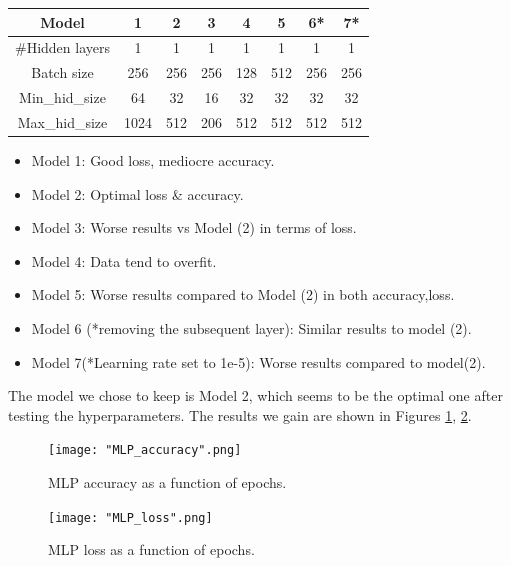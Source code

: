 \documentclass[10pt, a4paper]{article}
\begin{document}
  
    \begin{center}
    \begin{tabular}{|c|c|c|c|c|c|c|c|}
    \hline
    \textbf{Model} & \textbf{1} & \textbf{2} & \textbf{3} & \textbf{4} & \textbf{5} & \textbf{6*} & \textbf{7*} \\
    \hline
    \#Hidden layers & 1 & 1 & 1 & 1 & 1 & 1 & 1 \\
    \hline
    Batch size & 256 & 256 & 256 & 128 & 512 & 256 & 256 \\
    \hline
    Min\_hid\_size & 64 & 32 & 16 & 32 & 32 & 32 & 32 \\
    \hline
    Max\_hid\_size & 1024 & 512 & 206 & 512 & 512 & 512 & 512 \\
    \hline
    
    
    
    \end{tabular}
    \end{center}

    \begin{itemize}
        \item{Model 1: Good loss, mediocre accuracy.}
        \item{Model 2: Optimal loss \& accuracy.}
        \item{Model 3: Worse results vs Model (2) in terms of loss.}
        \item{Model 4: Data tend to overfit.}
        \item{Model 5: Worse results compared to Model (2) in both accuracy,loss.}
        \item{Model 6 (*removing the subsequent layer): Similar results to model (2).}
        \item{Model 7(*Learning rate set to 1e-5): Worse results compared to model(2).}


    \end{itemize}
    The model we chose to keep is Model 2, which seems to be the optimal one after testing the hyperparameters. The results we gain are shown in Figures \ref{fig::mlp_accuracy}, \ref{fig::mlp_loss}.

    \begin{figure}
	    \centering
            \texttt{[image: "MLP\_accuracy".png]}
	    \caption{MLP accuracy as a function of epochs.}
	    \label{fig::mlp_accuracy}
    \end{figure}

    \begin{figure}
	    \centering
            \texttt{[image: "MLP\_loss".png]}
	    \caption{MLP loss as a function of epochs.}
	    \label{fig::mlp_loss}
	\end{figure}
\end{document}
